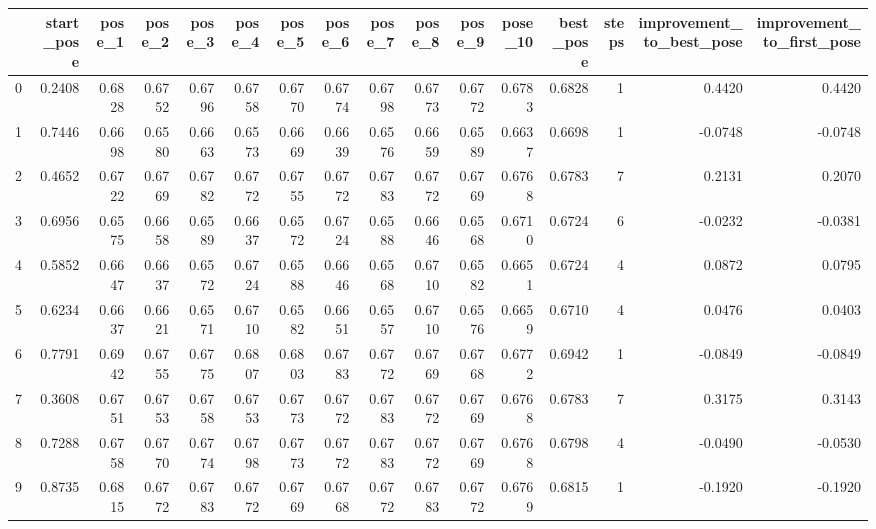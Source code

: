 \begin{tabular}{lrrrrrrrrrrrrrrr}
\toprule
{} &  start\_pose &  pose\_1 &  pose\_2 &  pose\_3 &  pose\_4 &  pose\_5 &  pose\_6 &  pose\_7 &  pose\_8 &  pose\_9 &  pose\_10 &  best\_pose &  steps &  improvement\_to\_best\_pose &  improvement\_to\_first\_pose \\
\midrule
0   &      0.2408 &  0.6828 &  0.6752 &  0.6796 &  0.6758 &  0.6770 &  0.6774 &  0.6798 &  0.6773 &  0.6772 &   0.6783 &     0.6828 &      1 &                    0.4420 &                     0.4420 \\
1   &      0.7446 &  0.6698 &  0.6580 &  0.6663 &  0.6573 &  0.6669 &  0.6639 &  0.6576 &  0.6659 &  0.6589 &   0.6637 &     0.6698 &      1 &                   -0.0748 &                    -0.0748 \\
2   &      0.4652 &  0.6722 &  0.6769 &  0.6782 &  0.6772 &  0.6755 &  0.6772 &  0.6783 &  0.6772 &  0.6769 &   0.6768 &     0.6783 &      7 &                    0.2131 &                     0.2070 \\
3   &      0.6956 &  0.6575 &  0.6658 &  0.6589 &  0.6637 &  0.6572 &  0.6724 &  0.6588 &  0.6646 &  0.6568 &   0.6710 &     0.6724 &      6 &                   -0.0232 &                    -0.0381 \\
4   &      0.5852 &  0.6647 &  0.6637 &  0.6572 &  0.6724 &  0.6588 &  0.6646 &  0.6568 &  0.6710 &  0.6582 &   0.6651 &     0.6724 &      4 &                    0.0872 &                     0.0795 \\
5   &      0.6234 &  0.6637 &  0.6621 &  0.6571 &  0.6710 &  0.6582 &  0.6651 &  0.6557 &  0.6710 &  0.6576 &   0.6659 &     0.6710 &      4 &                    0.0476 &                     0.0403 \\
6   &      0.7791 &  0.6942 &  0.6755 &  0.6775 &  0.6807 &  0.6803 &  0.6783 &  0.6772 &  0.6769 &  0.6768 &   0.6772 &     0.6942 &      1 &                   -0.0849 &                    -0.0849 \\
7   &      0.3608 &  0.6751 &  0.6753 &  0.6758 &  0.6753 &  0.6773 &  0.6772 &  0.6783 &  0.6772 &  0.6769 &   0.6768 &     0.6783 &      7 &                    0.3175 &                     0.3143 \\
8   &      0.7288 &  0.6758 &  0.6770 &  0.6774 &  0.6798 &  0.6773 &  0.6772 &  0.6783 &  0.6772 &  0.6769 &   0.6768 &     0.6798 &      4 &                   -0.0490 &                    -0.0530 \\
9   &      0.8735 &  0.6815 &  0.6772 &  0.6783 &  0.6772 &  0.6769 &  0.6768 &  0.6772 &  0.6783 &  0.6772 &   0.6769 &     0.6815 &      1 &                   -0.1920 &                    -0.1920 \\

\end{tabular}
